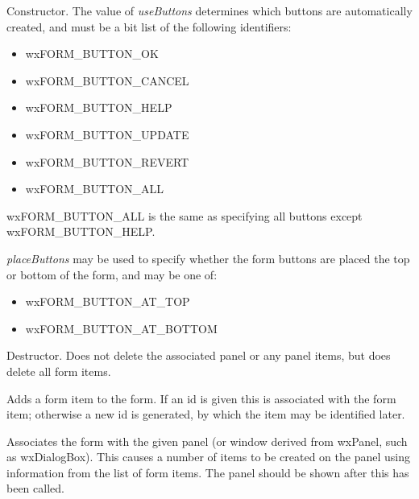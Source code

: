 

Constructor. The value of {\it useButtons} determines which buttons are
automatically created, and must be a bit list of the following
identifiers:

\begin{itemize}\itemsep=0pt
\item wxFORM\_BUTTON\_OK
\item wxFORM\_BUTTON\_CANCEL
\item wxFORM\_BUTTON\_HELP
\item wxFORM\_BUTTON\_UPDATE
\item wxFORM\_BUTTON\_REVERT
\item wxFORM\_BUTTON\_ALL
\end{itemize}

wxFORM\_BUTTON\_ALL is the same as specifying all buttons except
wxFORM\_BUTTON\_HELP.

{\it placeButtons} may be used to specify whether the form buttons are
placed the top or bottom of the form, and may be one of:

\begin{itemize}\itemsep=0pt
\item wxFORM\_BUTTON\_AT\_TOP
\item wxFORM\_BUTTON\_AT\_BOTTOM
\end{itemize}



Destructor. Does not delete the associated panel or any panel items, but
does delete all form items.

\label{wxformadd}


Adds a form item to the form. If an id is given this is associated with
the form item; otherwise a new id is generated, by which the item may be
identified later.

\label{wxformassociate}


Associates the form with the given panel (or window derived from wxPanel, such as
wxDialogBox). This causes a number of items to be created on the panel
using information from the list of form items. The panel should be shown
after this has been called.

